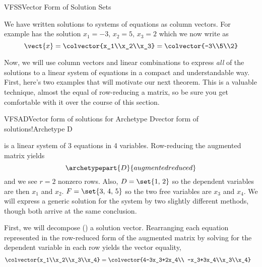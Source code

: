 \begin{subsect}{VFSS}{Vector Form of Solution Sets}
%
\begin{para}We have written solutions to systems of equations as column vectors.  For example  has the solution  $x_1 = -3,\,x_2 = 5,\,x_3 = 2$ which we now write as
%
\begin{equation*}
\vect{x}=\colvector{x_1\\x_2\\x_3}=\colvector{-3\\5\\2}
\end{equation*}\end{para}
%
\begin{para}Now, we will use column vectors and linear combinations to express {\em all} of the solutions to a linear system of equations in a compact and understandable way.  First, here's two examples that will motivate our next theorem.  This is a valuable technique, almost the equal of row-reducing a matrix, so be sure you get comfortable with it over the course of this section.\end{para}
%
\begin{example}{VFSAD}{Vector form of solutions for Archetype D}{vector form of solutions!Archetype D}
\begin{para} is a linear system of 3 equations in 4 variables.  Row-reducing the augmented matrix yields
%
\begin{equation*}
\archetypepart{D}{augmentedreduced}\end{equation*}
%
and we see $r=2$ nonzero rows. Also, $D=\set{1,\,2}$ so the dependent variables are then $x_1$ and $x_2$.  $F=\set{3,\,4,\,5}$ so the two free variables are $x_3$ and $x_4$.  We will express a generic solution for the system by two slightly different methods, though both arrive at the same conclusion.\end{para}
%
\begin{para}First, we will decompose () a solution vector.  Rearranging each equation represented in the row-reduced form of the augmented matrix by solving for the dependent variable in each row yields the vector equality,
%
\begin{align*}
\colvector{x_1\\x_2\\x_3\\x_4}&=
\colvector{4-3x_3+2x_4\\ -x_3+3x_4\\x_3\\x_4}

\end{align*}
\end{para}
\end{example}
\end{subsect}
